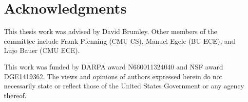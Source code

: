 \documentclass[12pt,final,oldfontcommands,oneside,letterpaper]{memoir}
\begin{document}
\frontmatter

\thetitlepage
\copyrightpage

\pagestyle{plain}
\section*{Acknowledgments}
\setcounter{page}{3}
This thesis work was advised by David Brumley.
Other members of the committee include Frank Pfenning (CMU CS), Manuel Egele (BU ECE), and Lujo Bauer (CMU ECE).

This work was funded by DARPA award N660011324040 and NSF award DGE1419362.
The views and opinions of authors expressed herein do not necessarily state or reflect those of the United States Government or any agency thereof.


\newpage

\pagestyle{plain}
\clearpage

\setcmuspacing
\begin{abstract}
        {\small }
\end{abstract}


\tableofcontents

\mainmatter








\backmatter
\renewcommand{\bibsection}{\chapter{\bibname}}


\end{document}
